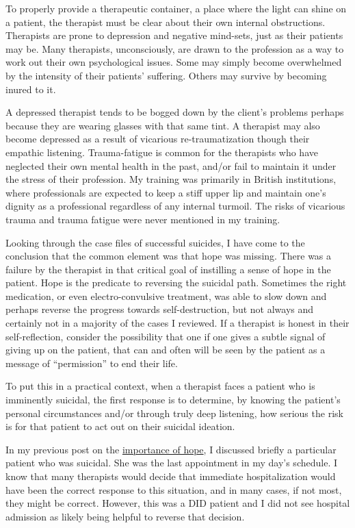 \documentclass[]{book}
\begin{document}
To properly provide a therapeutic container, a place where the light can shine on a patient, the therapist must be clear about their own internal obstructions. Therapists are prone to depression and negative mind-sets, just as their patients may be. Many therapists, unconsciously, are drawn to the profession as a way to work out their own psychological issues. Some may simply become overwhelmed by the intensity of their patients' suffering. Others may survive by becoming inured to it.

A depressed therapist tends to be bogged down by the client's problems perhaps because they are wearing glasses with that same tint. A therapist may also become depressed as a result of vicarious re-traumatization though their empathic listening. Trauma-fatigue is common for the therapists who have neglected their own mental health in the past, and/or fail to maintain it under the stress of their profession. My training was primarily in British institutions, where professionals are expected to keep a stiff upper lip and maintain one's dignity as a professional regardless of any internal turmoil. The risks of vicarious trauma and trauma fatigue were never mentioned in my training.

Looking through the case files of successful suicides, I have come to the conclusion that the common element was that hope was missing. There was a failure by the therapist in that critical goal of instilling a sense of hope in the patient. Hope is the predicate to reversing the suicidal path. Sometimes the right medication, or even electro-convulsive treatment, was able to slow down and perhaps reverse the progress towards self-destruction, but not always and certainly not in a majority of the cases I reviewed. If a therapist is honest in their self-reflection, consider the possibility that one if one gives a subtle signal of giving up on the patient, that can and often will be seen by the patient as a message of ``permission'' to end their life.

To put this in a practical context, when a therapist faces a patient who is imminently suicidal, the first response is to determine, by knowing the patient's personal circumstances and/or through truly deep listening, how serious the risk is for that patient to act out on their suicidal ideation.

In my previous post on the \href{https://www.engagingmultiples.com/the-importance-of-hope/}{importance of hope}, I discussed briefly a particular patient who was suicidal. She was the last appointment in my day's schedule. I know that many therapists would decide that immediate hospitalization would have been the correct response to this situation, and in many cases, if not most, they might be correct. However, this was a DID patient and I did not see hospital admission as likely being helpful to reverse that decision.
\end{document}
